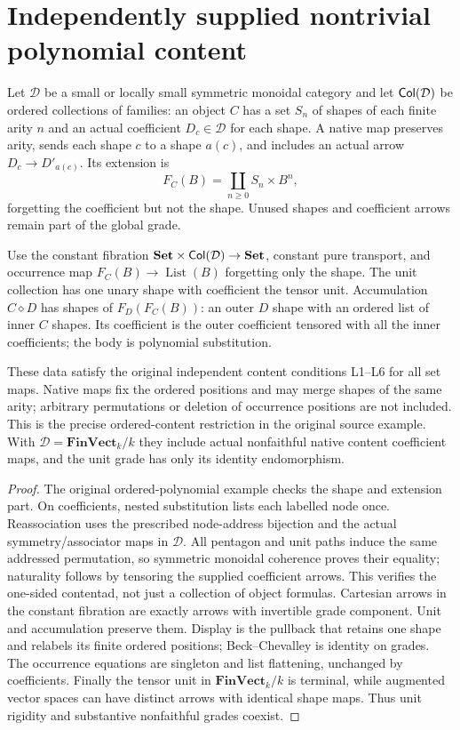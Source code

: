 \documentclass[11pt]{article}
\begin{document}
\section{Independently supplied nontrivial polynomial content}
Let $\mathcal D$ be a small or locally small symmetric monoidal category and let $\mathsf{Col}(\mathcal D)$ be ordered collections of families: an object $C$ has a set $S_n$ of shapes of each finite arity $n$ and an actual coefficient $D_c\in\mathcal D$ for each shape. A native map preserves arity, sends each shape $c$ to a shape $a(c)$, and includes an actual arrow $D_c\to D'_{a(c)}$. Its extension is
\[
 F_C(B)=\coprod_{n\geq0}S_n\times B^n,
\]
forgetting the coefficient but not the shape. Unused shapes and coefficient arrows remain part of the global grade.

Use the constant fibration $\mathbf{Set}\times\mathsf{Col}(\mathcal D)\to\mathbf{Set}$, constant pure transport, and occurrence map $F_C(B)\to\operatorname{List}(B)$ forgetting only the shape. The unit collection has one unary shape with coefficient the tensor unit. Accumulation $C\diamond D$ has shapes of $F_D(F_C(B))$: an outer $D$ shape with an ordered list of inner $C$ shapes. Its coefficient is the outer coefficient tensored with all the inner coefficients; the body is polynomial substitution.

\begin{lemma}
These data satisfy the original independent content conditions L1--L6 for all set maps. Native maps fix the ordered positions and may merge shapes of the same arity; arbitrary permutations or deletion of occurrence positions are not included. This is the precise ordered-content restriction in the original source example. With $\mathcal D=\mathbf{FinVect}_k/k$ they include actual nonfaithful native content coefficient maps, and the unit grade has only its identity endomorphism.
\end{lemma}
\begin{proof}
The original ordered-polynomial example checks the shape and extension part. On coefficients, nested substitution lists each labelled node once. Reassociation uses the prescribed node-address bijection and the actual symmetry/associator maps in $\mathcal D$. All pentagon and unit paths induce the same addressed permutation, so symmetric monoidal coherence proves their equality; naturality follows by tensoring the supplied coefficient arrows. This verifies the one-sided contentad, not just a collection of object formulas. Cartesian arrows in the constant fibration are exactly arrows with invertible grade component. Unit and accumulation preserve them. Display is the pullback that retains one shape and relabels its finite ordered positions; Beck--Chevalley is identity on grades. The occurrence equations are singleton and list flattening, unchanged by coefficients. Finally the tensor unit in $\mathbf{FinVect}_k/k$ is terminal, while augmented vector spaces can have distinct arrows with identical shape maps. Thus unit rigidity and substantive nonfaithful grades coexist.
\end{proof}
\end{document}

